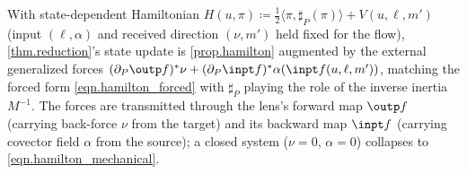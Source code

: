 \begin{remark}\label{rmk.hamilton_correspondence}
With state-dependent Hamiltonian $H(u,\pi)\coloneqq\tfrac{1}{2}\langle\pi,\sharp_P(\pi)\rangle+V(u,\ell,m')$ (input $(\ell,\alpha)$ and received direction $(\nu,m')$ held fixed for the flow), \cref{thm.reduction}'s state update is \cref{prop.hamilton} augmented by the external generalized forces $(\partial_P\outp f)^*\nu+(\partial_P\inpt f)^*\alpha(\inpt f(u,\ell,m'))$, matching the forced form \eqref{eqn.hamilton_forced} with $\sharp_P$ playing the role of the inverse inertia $M^{-1}$. The forces are transmitted through the lens's forward map $\outp f$ (carrying back-force $\nu$ from the target) and its backward map $\inpt f$ (carrying covector field $\alpha$ from the source); a closed system ($\nu=0$, $\alpha=0$) collapses to \eqref{eqn.hamilton_mechanical}.\qedhere
\end{remark}

